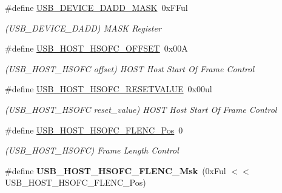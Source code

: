 \begin{DoxyCompactItemize}
\item 
\hypertarget{group___s_a_m_l21___u_s_b_gae61b79de5fb3ef4993711863ae493788}{}\#define \hyperlink{group___s_a_m_l21___u_s_b_gae61b79de5fb3ef4993711863ae493788}{U\+S\+B\+\_\+\+D\+E\+V\+I\+C\+E\+\_\+\+D\+A\+D\+D\+\_\+\+M\+A\+S\+K}~0x\+F\+Ful\label{group___s_a_m_l21___u_s_b_gae61b79de5fb3ef4993711863ae493788}

\begin{DoxyCompactList}\small\item\em (U\+S\+B\+\_\+\+D\+E\+V\+I\+C\+E\+\_\+\+D\+A\+D\+D) M\+A\+S\+K Register \end{DoxyCompactList}\item 
\hypertarget{group___s_a_m_l21___u_s_b_gac1aa46c243c881119dd359388f4a2242}{}\#define \hyperlink{group___s_a_m_l21___u_s_b_gac1aa46c243c881119dd359388f4a2242}{U\+S\+B\+\_\+\+H\+O\+S\+T\+\_\+\+H\+S\+O\+F\+C\+\_\+\+O\+F\+F\+S\+E\+T}~0x00\+A\label{group___s_a_m_l21___u_s_b_gac1aa46c243c881119dd359388f4a2242}

\begin{DoxyCompactList}\small\item\em (U\+S\+B\+\_\+\+H\+O\+S\+T\+\_\+\+H\+S\+O\+F\+C offset) H\+O\+S\+T Host Start Of Frame Control \end{DoxyCompactList}\item 
\hypertarget{group___s_a_m_l21___u_s_b_ga6a35ee1ec349f984750b35e0d6f97cf5}{}\#define \hyperlink{group___s_a_m_l21___u_s_b_ga6a35ee1ec349f984750b35e0d6f97cf5}{U\+S\+B\+\_\+\+H\+O\+S\+T\+\_\+\+H\+S\+O\+F\+C\+\_\+\+R\+E\+S\+E\+T\+V\+A\+L\+U\+E}~0x00ul\label{group___s_a_m_l21___u_s_b_ga6a35ee1ec349f984750b35e0d6f97cf5}

\begin{DoxyCompactList}\small\item\em (U\+S\+B\+\_\+\+H\+O\+S\+T\+\_\+\+H\+S\+O\+F\+C reset\+\_\+value) H\+O\+S\+T Host Start Of Frame Control \end{DoxyCompactList}\item 
\hypertarget{group___s_a_m_l21___u_s_b_gaa7d764b82c769e5fba6b45dc17587826}{}\#define \hyperlink{group___s_a_m_l21___u_s_b_gaa7d764b82c769e5fba6b45dc17587826}{U\+S\+B\+\_\+\+H\+O\+S\+T\+\_\+\+H\+S\+O\+F\+C\+\_\+\+F\+L\+E\+N\+C\+\_\+\+Pos}~0\label{group___s_a_m_l21___u_s_b_gaa7d764b82c769e5fba6b45dc17587826}

\begin{DoxyCompactList}\small\item\em (U\+S\+B\+\_\+\+H\+O\+S\+T\+\_\+\+H\+S\+O\+F\+C) Frame Length Control \end{DoxyCompactList}\item 
\hypertarget{group___s_a_m_l21___u_s_b_gac1829acae3cf0d9c38208fdf50ae71e1}{}\#define {\bfseries U\+S\+B\+\_\+\+H\+O\+S\+T\+\_\+\+H\+S\+O\+F\+C\+\_\+\+F\+L\+E\+N\+C\+\_\+\+Msk}~(0x\+Ful $<$$<$ U\+S\+B\+\_\+\+H\+O\+S\+T\+\_\+\+H\+S\+O\+F\+C\+\_\+\+F\+L\+E\+N\+C\+\_\+\+Pos)\label{group___s_a_m_l21___u_s_b_gac1829acae3cf0d9c38208fdf50ae71e1}


\end{DoxyCompactItemize}
